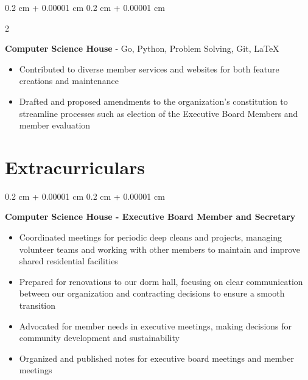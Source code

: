 \documentclass[10pt, letterpaper]{article}
\newenvironment{highlights}{
    \begin{itemize}[
        topsep=0.10 cm,
        parsep=0.10 cm,
        partopsep=0pt,
        itemsep=0pt,
        leftmargin=0.4 cm + 10pt
    ]
}{
    \end{itemize}
} %
\newenvironment{onecolentry}{
    \begin{adjustwidth}{
        0.2 cm + 0.00001 cm
    }{
        0.2 cm + 0.00001 cm
    }
}{
    \end{adjustwidth}
} %
\newenvironment{twocolentry}[2][]{
    \onecolentry
    \def\secondColumn{#2}
    \setcolumnwidth{\fill, 4.5 cm}
    \begin{paracol}{2}
}{
    \switchcolumn \raggedleft \secondColumn
    \end{paracol}
    \endonecolentry
} %
\let\hrefWithoutArrow\href
\renewcommand{\href}[2]{\hrefWithoutArrow{#1}{\ifthenelse{\equal{#2}{}}{ }{#2 }\raisebox{.15ex}{\footnotesize \faExternalLink*}}}
\begin{document}
        \begin{twocolentry}{
            \hrefWithoutArrow{https://github.com/ComputerScienceHouse}{{\footnotesize\faGithub}\hspace*{0.13cm}{shaeespring?org=CSH}}
        }
            \textbf{Computer Science House} - Go, Python, Problem Solving, Git, LaTeX \begin{highlights}
                \item Contributed to diverse member services and websites for both feature creations and maintenance
                \item Drafted and proposed amendments to the organization's constitution to streamline processes such as election of the Executive Board Members and member evaluation
            \end{highlights}
        \end{twocolentry}


    \vspace{-0.2cm}
    \endgroup
    \section{\large\bfseries Extracurriculars}

        \begingroup


        
        \begin{onecolentry}
            \textbf{Computer Science House - Executive Board Member and Secretary} 
            \begin{highlights}
                \item Coordinated meetings for periodic deep cleans and projects, managing volunteer teams and working with other members to maintain and improve shared residential facilities
                \item Prepared for renovations to our dorm hall, focusing on clear communication between our organization and contracting decisions to ensure a smooth transition
                \item Advocated for member needs in executive meetings, making decisions for community development and sustainability
                \item Organized and published notes for executive board meetings and member meetings
            \end{highlights}
        \end{onecolentry}

        \endgroup
    
\end{document}
